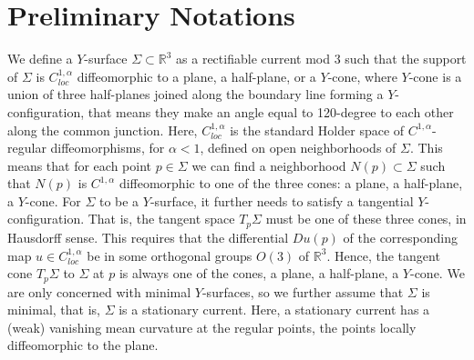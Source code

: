 \documentclass[11pt]{amsart}
\numberwithin{equation}{section}
\theoremstyle{theorem}
\theoremstyle{definition}
\numberwithin{equation}{section}
\begin{document}
\section{Preliminary Notations}
We define a $Y$-surface $\Sigma \subset \mathbb{R}^3$ as a rectifiable current mod 3 such that the support of $\Sigma$ is $C^{1,\alpha}_{loc}$ diffeomorphic to a plane, a half-plane, or a $Y$-cone, where $Y$-cone is a union of three half-planes joined along the boundary line forming a $Y$-configuration, that means they make an angle equal to 120-degree to each other along the common junction. Here, $C_{loc}^{1,\alpha}$ is the standard Holder space of $C^{1,\alpha}$-regular diffeomorphisms, for $\alpha <1$, defined on open neighborhoods of $\Sigma$. This means that for each point $p\in \Sigma$ we can find a neighborhood $N(p)\subset \Sigma$ such that $N(p)$ is $C^{1,\alpha}$ diffeomorphic to one of the three cones: a plane, a half-plane, a $Y$-cone. For $\Sigma$ to be a $Y$-surface, it further needs to satisfy a tangential $Y$-configuration. That is, the tangent space $T_p\Sigma$ must be one of these three cones, in Hausdorff sense. This requires that the differential $Du(p)$ of the corresponding map $u\in C_{loc}^{1,\alpha}$ be in some orthogonal groups $O(3)$ of $\mathbb{R}^3$. Hence, the tangent cone $T_p\Sigma$ to $\Sigma$ at $p$ is always one of the cones, a plane, a half-plane, a $Y$-cone. We are only concerned with minimal $Y$-surfaces, so we further assume that $\Sigma$ is minimal, that is, $\Sigma$ is a stationary current. Here, a stationary current has a (weak) vanishing mean curvature at the regular points, the points locally diffeomorphic to the plane. 
\medskip
\end{document}
